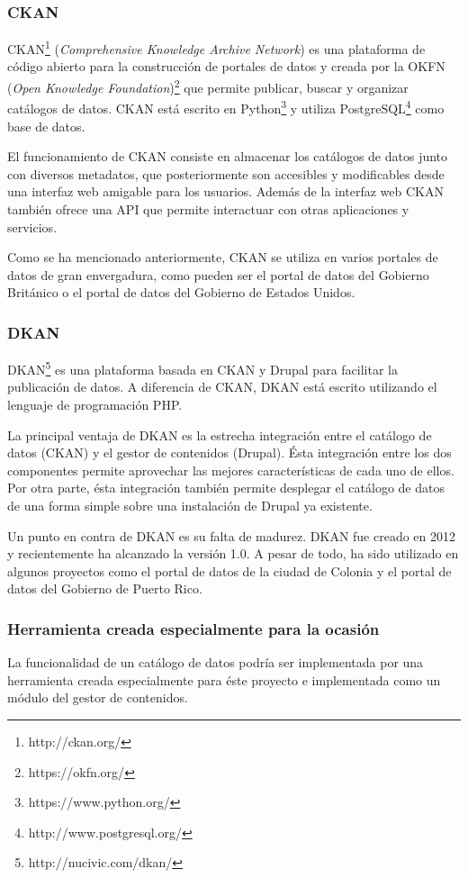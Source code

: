 \subsubsection{CKAN}
CKAN\footnote{http://ckan.org/} (\textit{Comprehensive Knowledge Archive Network}) es una plataforma de código abierto para la construcción de portales de datos y creada por la OKFN (\textit{Open Knowledge Foundation})\footnote{https://okfn.org/} que permite publicar, buscar y organizar catálogos de datos. CKAN está escrito en Python\footnote{https://www.python.org/} y utiliza PostgreSQL\footnote{http://www.postgresql.org/} como base de datos.

El funcionamiento de CKAN consiste en almacenar los catálogos de datos junto con diversos metadatos, que posteriormente son accesibles y modificables desde una interfaz web amigable para los usuarios.  Además de la interfaz web CKAN también ofrece una API que permite interactuar con otras aplicaciones y servicios.

Como se ha mencionado anteriormente, CKAN se utiliza en varios portales de datos de gran envergadura, como pueden ser el portal de datos del Gobierno Británico o el portal de datos del Gobierno de Estados Unidos.


\subsubsection{DKAN}
DKAN\footnote{http://nucivic.com/dkan/} es una plataforma basada en CKAN y Drupal para facilitar la publicación de datos.  A diferencia de CKAN, DKAN está escrito utilizando el lenguaje de programación PHP.

La principal ventaja de DKAN es la estrecha integración entre el catálogo de datos (CKAN) y el gestor de contenidos (Drupal).  Ésta integración entre los dos componentes permite aprovechar las mejores características de cada uno de ellos.  Por otra parte, ésta integración también permite desplegar el catálogo de datos de una forma simple sobre una instalación de Drupal ya existente.

Un punto en contra de DKAN es su falta de madurez.  DKAN fue creado en 2012 y recientemente ha alcanzado la versión 1.0.  A pesar de todo, ha sido utilizado en algunos proyectos como el portal de datos de la ciudad de Colonia y el portal de datos del Gobierno de Puerto Rico.


\subsubsection{Herramienta creada especialmente para la ocasión}
La funcionalidad de un catálogo de datos podría ser implementada por una herramienta creada especialmente para éste proyecto e implementada como un módulo del gestor de contenidos.

